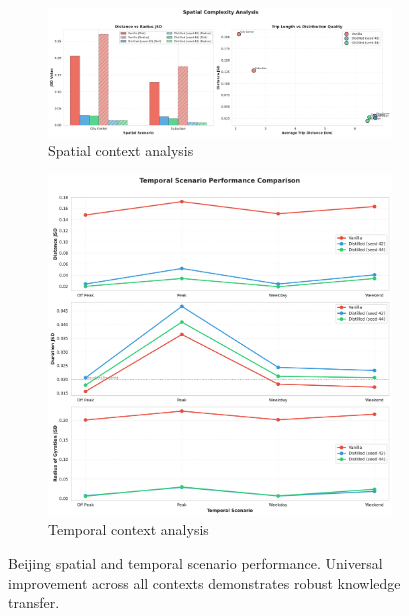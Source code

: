 \begin{figure}[H]
    \centering
    \begin{subfigure}{0.49\linewidth}
        \centering
        \includegraphics[width=\linewidth]{assets/plots/eval/beijing/scenarios/spatial_scenarios_analysis.pdf}
        \caption{Spatial context analysis}
    \end{subfigure}
    \begin{subfigure}{0.49\linewidth}
        \centering
        \includegraphics[width=\linewidth]{assets/plots/eval/beijing/scenarios/temporal_scenarios_comparison.pdf}
        \caption{Temporal context analysis}
    \end{subfigure}
    \caption{Beijing spatial and temporal scenario performance. Universal improvement across all contexts demonstrates robust knowledge transfer.}
    \label{fig:appendix-beijing-scenario-spatial}
\end{figure}


